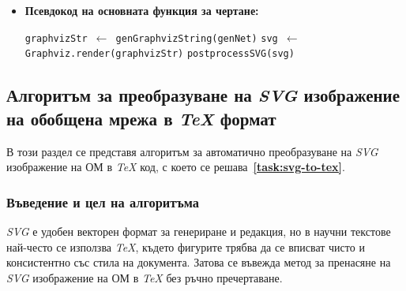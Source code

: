 \begin{itemize}
\begin{algorithm}[H]
\begin{algorithmic}
        \State \texttt{points $\gets$ getTransitionPoints(transition)}
        \State \texttt{topPoint $\gets$ findTopMostPoint(points)}
        \State \texttt{addBlackTriangle(topPoint)}
        \State \texttt{label $\gets$ getTransitionLabel(transition)}
        \State \texttt{placeLabelAboveTriangle(topPoint, label)}
    \EndFor

        \State \texttt{circle $\gets$ findCircle(position)}
        \State \texttt{centerPoint $\gets$ getCenterPoint(circle)}
        \State \texttt{label $\gets$ getPositionLabel(position)}
        \State \texttt{placeLabelAboveCircle(centerPoint, label)}
    \EndFor

    \State \texttt{outputSVG $\gets$ saveUpdatedSVG(svg)}
    \State \texttt{return outputSVG}
    \end{algorithmic}
    \end{algorithm}

    \item \textbf{Псевдокод на основната функция за чертане:}

    \begin{algorithm}[H]
    \caption{drawGenNet(genNet)}
    \begin{algorithmic}
    \State \texttt{graphvizStr $\gets$ genGraphvizString(genNet)}
    \State \texttt{svg $\gets$  Graphviz.render(graphvizStr)}
    \State \texttt{postprocessSVG(svg)}
    \end{algorithmic}
    \end{algorithm}
\end{itemize}

\subsection{Алгоритъм за преобразуване на \textit{SVG} изображение на обобщена мрежа в \textit{TeX} формат}

\hspace*{2.5em}В този раздел се представя алгоритъм за автоматично преобразуване на \textit{SVG} изображение на ОМ в \textit{TeX} код, с което се решава~\textbf{\ref{task:svg-to-tex}}.

\subsubsection{Въведение и цел на алгоритъма}
\hspace*{2.5em}\textit{SVG} е удобен векторен формат за генериране и редакция, но в научни текстове най-често се използва \textit{TeX}, където фигурите трябва да се вписват чисто и консистентно със стила на документа. Затова се въвежда метод за пренасяне на \textit{SVG} изображение на ОМ в \textit{TeX} без ръчно пречертаване.

